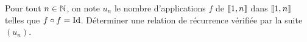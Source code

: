 \documentclass{magnolia}
\begin{document}
%
%

Pour tout $n\in\mathbb{N}$, on note $u_n$ le nombre d'applications $f$ de $\left\llbracket 1,n\right\rrbracket$ dans
$\left\llbracket 1,n\right\rrbracket$ telles que $f\circ f=\operatorname{Id}$. Déterminer une relation de récurrence vérifiée
par la suite $(u_n)$.


\end{document}
